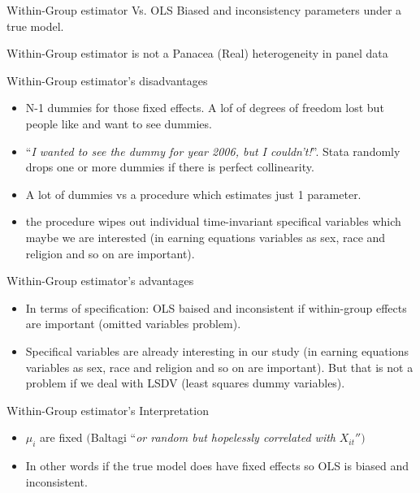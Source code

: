 \begin{frame}{Within-Group estimator Vs. OLS}
	Biased and inconsistency parameters under a true model.
		\begin{center}
			
		\end{center}
\end{frame}
\begin{frame}{Within-Group estimator is not a Panacea}
	(Real) heterogeneity in panel data
		\begin{center}
			
		\end{center}
\end{frame}
\begin{frame}{Within-Group estimator's disadvantages}
	\begin{itemize}
		\item N-1 dummies for those fixed effects. A lof of degrees of freedom lost but people like and want to see dummies.
		\item ``\emph{I wanted to see the dummy for year 2006, but I couldn't!}''. Stata randomly drops one or more dummies if there is perfect collinearity.
		\item A lot of dummies vs a procedure which estimates just 1 parameter.
		\item the procedure wipes out individual time-invariant specifical variables which maybe we are interested (in earning equations variables as sex, race and religion and so on are important).
	\end{itemize}
\end{frame}
\begin{frame}{Within-Group estimator's advantages}
	\begin{itemize}
		\item In terms of specification: OLS baised and inconsistent if within-group effects are important (omitted variables problem).
		\item Specifical variables are already interesting in our study (in earning equations variables as sex, race and religion and so on are important). But that is not a problem if we deal with LSDV (least squares dummy variables).
	\end{itemize}
\end{frame}
\begin{frame}{Within-Group estimator's Interpretation}
	\begin{itemize}
		\item $\mu_{i}$ are fixed $($Baltagi ``\emph{or random but hopelessly correlated with }$\mathit{X}_{it}'')$
		\item In other words if the true model does have fixed effects so OLS is biased and inconsistent.
	\end{itemize}
\end{frame}

